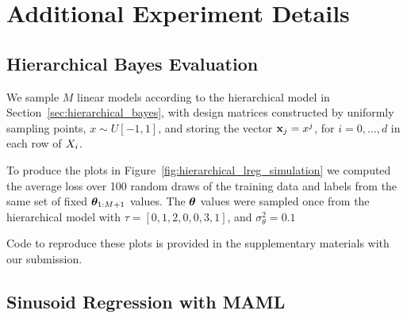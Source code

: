 \section{Additional Experiment Details}
\label{app:exp_details}

\subsection{Hierarchical Bayes Evaluation}
We sample $M$ linear models according to the hierarchical model in Section~\ref{sec:hierarchical_bayes}, with design matrices constructed by uniformly sampling points, $x \sim U[-1,1]$, and storing the vector $\mathbf{x}_j = x^j$, for $i=0,\ldots,d$ in each row of $X_{i}$.

To produce the plots in Figure~\ref{fig:hierarchical_lreg_simulation} we computed the average loss over 100 random draws of the training data and labels from the same set of fixed $\bm{\theta}_{1:M+1}$ values. The $\bm{\theta}$ values were sampled once from the hierarchical model with $\tau = [0, 1, 2, 0, 0, 3, 1]$, and $\sigma^2_\theta = 0.1$

Code to reproduce these plots is provided in the supplementary materials with our submission.

\subsection{Sinusoid Regression with MAML}

% 

